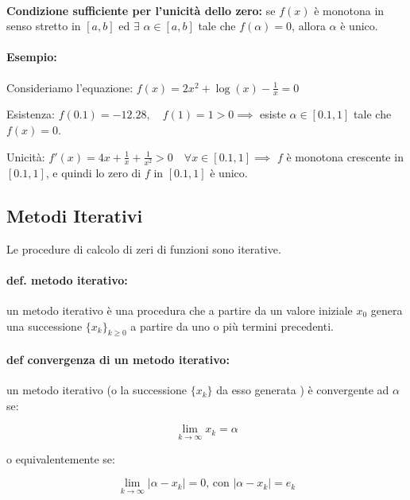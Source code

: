 \documentclass[a4paper, 11pt]{article}
\begin{document}
        \paragraph{}
        \textbf{Condizione sufficiente per l'unicità dello zero:} se \( f(x) \) è monotona in senso stretto in \([a,b]\) ed $\exists$ \( \alpha \in [a,b] \) tale che \( f(\alpha) = 0 \), allora \( \alpha \) è unico.

        \paragraph{Esempio:}
        Consideriamo l'equazione: $f(x) = 2x^2 + \log(x) - \frac{1}{x} = 0$

        Esistenza: $f(0.1) = -12.28, \quad f(1) = 1 > 0 \implies$ esiste \( \alpha \in [0.1, 1] \) tale che \( f(x) = 0 \).

        Unicità: $f'(x) = 4x + \frac{1}{x} + \frac{1}{x^2} > 0 \quad \forall x \in [0.1, 1] \implies$ \( f \) è monotona crescente in \([0.1, 1]\), e quindi lo zero di \( f \) in \([0.1, 1]\) è unico.



        \subsection{Metodi Iterativi}
        Le procedure di calcolo di zeri di funzioni sono iterative.

        \paragraph{def. metodo iterativo:} un metodo iterativo è una procedura che a partire da un valore iniziale $x_0$ genera una successione \( \{x_k\}_{k \geq 0} \) a partire da uno o più termini precedenti.

        \paragraph{def convergenza di un metodo iterativo:} un metodo iterativo (o la successione  \( \{x_k\} \) da esso generata ) è convergente ad \( \alpha \) se:

        \[
            \lim_{k \to \infty} x_k = \alpha
        \]

        o equivalentemente se:

        \[
            \lim_{k \to \infty} | \alpha - x_k | = 0 \text{, con $|\alpha-x_k| = e_k$}
        \]
\end{document}
